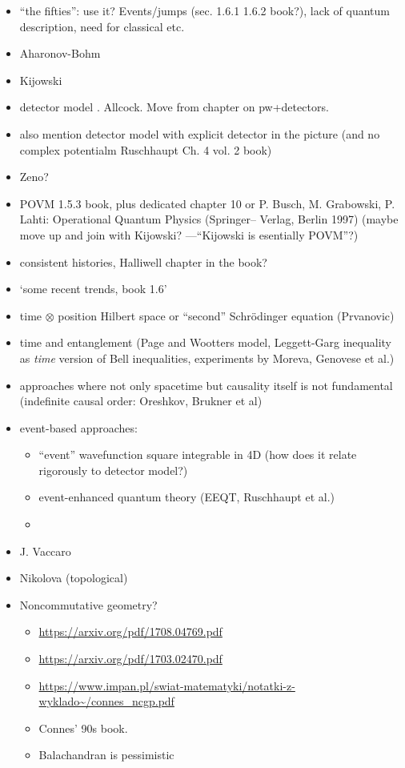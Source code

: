 \begin{itemize}
\item ``the fifties'': use it? Events/jumps (sec. 1.6.1 1.6.2 book?), lack of quantum description, need for classical etc.
\item Aharonov-Bohm
\item Kijowski
\item detector model \cite{TQM1, TQM2}. Allcock. Move from chapter on pw+detectors.
\item also mention detector model with explicit detector in the picture (and no complex potentialm Ruschhaupt Ch. 4 vol. 2 book)
\item Zeno?
\item POVM 1.5.3 book, plus dedicated chapter 10 or P. Busch, M. Grabowski, P. Lahti: Operational Quantum Physics (Springer–
Verlag, Berlin 1997) (maybe move up and join with Kijowski? ---``Kijowski is esentially POVM''?)
\item consistent histories, Halliwell chapter in the book?
\item `some recent trends, book 1.6'
\item
    time $\otimes$ position Hilbert space or ``second'' Schr\"odinger equation (Prvanovic)
\item time and entanglement (Page and Wootters model, Leggett-Garg inequality as \emph{time} version of Bell inequalities, experiments by Moreva, Genovese et al.)
\item approaches where not only spacetime but causality itself is not fundamental (indefinite causal order: Oreshkov, Brukner et al)
\item event-based approaches:
  \begin{itemize}
    \item ``event'' wavefunction square integrable in 4D (how does it relate rigorously to detector model?)
    \item event-enhanced quantum theory (EEQT, Ruschhaupt et al.)
    \item
  \end{itemize}
\item J. Vaccaro
\item Nikolova (topological)
\item Noncommutative geometry?
\begin{itemize}
  \item \url{https://arxiv.org/pdf/1708.04769.pdf}
  \item \url{https://arxiv.org/pdf/1703.02470.pdf}
  \item \url{https://www.impan.pl/swiat-matematyki/notatki-z-wyklado~/connes_ncgp.pdf}
  \item Connes' 90s book.
  \item Balachandran is pessimistic
\end{itemize}
\end{itemize}
